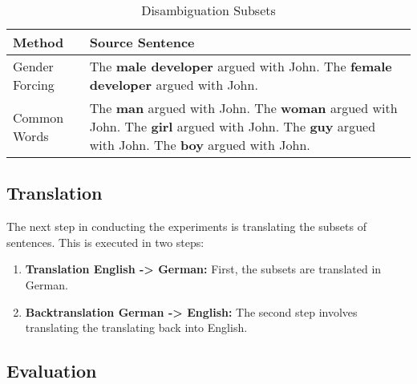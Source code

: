 \begin{table}
    \caption{Disambiguation Subsets}
    \label{tab:preprocessing}
    \begin{tabularx}{\linewidth}{|l|X|}
        \hline
        \textbf{Method} & \textbf{Source Sentence} \\ \hline
        Gender Forcing & The \textbf{male developer} argued with John. \newline
        The \textbf{female developer} argued with John. \\ \hline
        Common Words & The \textbf{man} argued with John. \newline
        The \textbf{woman} argued with John. \newline
        The \textbf{girl} argued with John. \newline
        The \textbf{guy} argued with John. \newline
        The \textbf{boy} argued with John. \\ \hline
    \end{tabularx}
\end{table}

\subsection{Translation}

The next step in conducting the experiments is translating the subsets of sentences. This is executed in two steps:

\begin{enumerate}
    \item \textbf{Translation English -> German:} 
    First, the subsets are translated in German.
    \item \textbf{Backtranslation German -> English:}
    The second step involves translating the translating back into English.
\end{enumerate}



\subsection{Evaluation}



